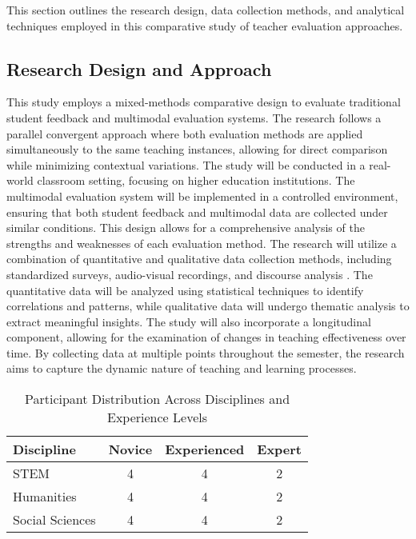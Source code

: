 This section outlines the research design, data collection methods, and analytical techniques employed in this comparative study of teacher evaluation approaches.

\subsection{Research Design and Approach}
This study employs a mixed-methods comparative design to evaluate traditional student feedback and multimodal evaluation systems. The research follows a parallel convergent approach where both evaluation methods are applied simultaneously to the same teaching instances, allowing for direct comparison while minimizing contextual variations.
The study will be conducted in a real-world classroom setting, focusing on higher education institutions. The multimodal evaluation system will be implemented in a controlled environment, ensuring that both student feedback and multimodal data are collected under similar conditions. This design allows for a comprehensive analysis of the strengths and weaknesses of each evaluation method.
The research will utilize a combination of quantitative and qualitative data collection methods, including standardized surveys, audio-visual recordings, and discourse analysis \cite{dmello2012multimodal, ochoa2016multimodal}. The quantitative data will be analyzed using statistical techniques to identify correlations and patterns, while qualitative data will undergo thematic analysis to extract meaningful insights.
The study will also incorporate a longitudinal component, allowing for the examination of changes in teaching effectiveness over time. By collecting data at multiple points throughout the semester, the research aims to capture the dynamic nature of teaching and learning processes.

\begin{table}[H]
    \normalsize
    \centering
    \caption{ Participant Distribution Across Disciplines and Experience Levels}
    \label{tab:participants}
    \begin{tabular}{lccc}
        \toprule
        \textbf{Discipline} & \textbf{Novice} & \textbf{Experienced} & \textbf{Expert} \\
        \midrule
        STEM & 4 & 4 & 2 \\
        Humanities & 4 & 4 & 2 \\
        Social Sciences & 4 & 4 & 2 \\
        \bottomrule
    \end{tabular}
\end{table}

